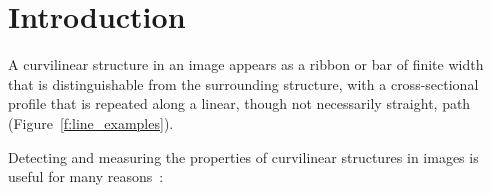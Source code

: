 \documentclass{IEEEtran}
\title{\ttl}
\author{Authors}
\newcommand{\fref}[1]{Figure~\ref{#1}}
\begin{document}
\tableofcontents\clearpage

\maketitle

\begin{abstract}
Estimating orientation of image structure underpins applications including digital mammography, retinography and fingerprint analysis. We consider different choices of filter bank including those based on first and second derivatives, efficient Haar-like features and the Dual Tree Complex Wavelet Transform. We then investigate how standard regressors (linear regression, Boosting and Random Forests) may be adapted to use the responses to these filter banks in order to predict orientation of image structure. For a quantitative evaluation, we use synthetic images based on mammograms and the publicly available DRIVE database of retinal images, and show that Random Forests and the wavelet transform offer superior accuracy though at a cost in efficiency. Qualitative results are also presented for real mammograms and fingerprint images.
\end{abstract}




\section{Introduction}
A curvilinear structure in an image appears as a ribbon or bar of finite width that is distinguishable from the surrounding structure, with a cross-sectional profile that is repeated along a linear, though not necessarily straight, path (\fref{f:line_examples}).


Detecting and measuring the properties of curvilinear structures in images is useful for many reasons~\cite{Ayres_Rangayyan_JEI07}:
\end{document}
